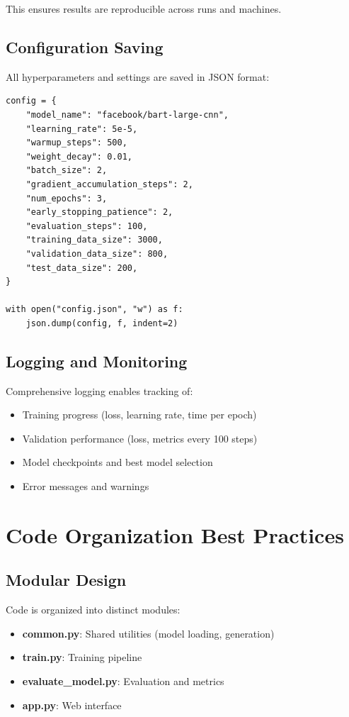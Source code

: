 \documentclass[12pt,a4paper,oneside]{report}
\begin{document}
This ensures results are reproducible across runs and machines.

\subsection{Configuration Saving}
All hyperparameters and settings are saved in JSON format:
\begin{lstlisting}
config = {
    "model_name": "facebook/bart-large-cnn",
    "learning_rate": 5e-5,
    "warmup_steps": 500,
    "weight_decay": 0.01,
    "batch_size": 2,
    "gradient_accumulation_steps": 2,
    "num_epochs": 3,
    "early_stopping_patience": 2,
    "evaluation_steps": 100,
    "training_data_size": 3000,
    "validation_data_size": 800,
    "test_data_size": 200,
}

with open("config.json", "w") as f:
    json.dump(config, f, indent=2)
\end{lstlisting}

\subsection{Logging and Monitoring}
Comprehensive logging enables tracking of:
\begin{itemize}
    \item Training progress (loss, learning rate, time per epoch)
    \item Validation performance (loss, metrics every 100 steps)
    \item Model checkpoints and best model selection
    \item Error messages and warnings
\end{itemize}

\section{Code Organization Best Practices}

\subsection{Modular Design}
Code is organized into distinct modules:
\begin{itemize}
    \item \textbf{common.py}: Shared utilities (model loading, generation)
    \item \textbf{train.py}: Training pipeline
    \item \textbf{evaluate\_model.py}: Evaluation and metrics
    \item \textbf{app.py}: Web interface
\end{itemize}
\end{document}
